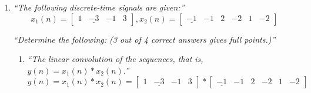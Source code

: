 \documentclass{article}
\begin{document}
\begin{enumerate}
    \item %
        \emph{``The following discrete-time signals are given:''}
        \begin{displaymath}
            x_1(n) = 
            \begin{bmatrix}
                1 & \underline{-3} & -1 & 3
            \end{bmatrix}
            ,
            x_2(n) = 
            \begin{bmatrix}
                \underline{-1} & -1 & 2 & -2 & 1 & -2
            \end{bmatrix}
        \end{displaymath}

        \emph{``Determine the following: (3 out of 4 correct answers gives full points.)''}
        \begin{enumerate}
            \item %
                \emph{``The linear convolution of the sequences, that is, $y(n) = x_1(n) * x_2(n)$.''} 
                \\
                \begin{displaymath}
                    y(n)=x_1(n)*x_2(n)=
                    \begin{bmatrix}
                        1 & \underline{-3} & -1 & 3
                    \end{bmatrix}
                    *
                    \begin{bmatrix}
                        \underline{-1} & -1 & 2 & -2 & 1 & -2
                    \end{bmatrix}
                \end{displaymath}


\end{enumerate}
\end{enumerate}
\end{document}

